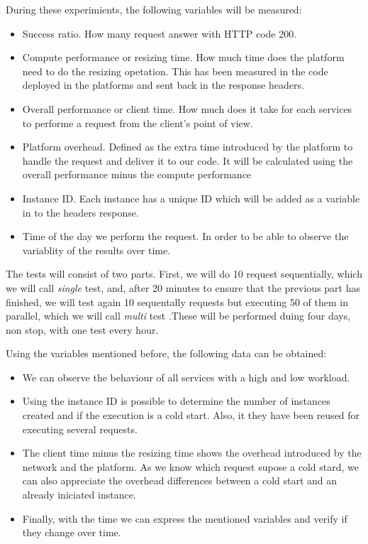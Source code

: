 \documentclass[11pt]{article}
\begin{document}
During these experimients, the following variables will be measured: 

\begin{itemize}
\item Success ratio. How many request answer with HTTP code 200.
\item Compute performance or resizing time. How much time does the platform need to do the resizing opetation. This has been measured in the code deployed in the platforms and sent back in the response headers. 
\item Overall performance or client time. How much does it take for each services to performe a request from the client's point of view. 
\item Platform overhead. Defined as the extra time introduced by the platform to handle the request and deliver it to our code. It will be calculated using the overall performance minus the compute performance
\item Instance ID. Each instance has a unique ID which will be added as a variable in to the headers response.
\item Time of the day we perform the request. In order to be able to observe the variablity of the results over time.
\end{itemize}


The tests will consist of two parts. First, we will do 10 request sequentially, which we will call \textit{single} test, and, after 20 minutes to ensure that the previous part has finished, we will test again 10 sequentally requests but executing 50 of them in parallel, which we will call \textit{multi} test .These will be performed duing four days, non stop, with one test every hour.


Using the variables mentioned before, the following data can be obtained:
\begin{itemize}
\item We can observe the behaviour of all services with a high and low workload.
\item Using the instance ID is possible to determine the number of instances created and if the execution is a cold start. Also, it they have been reused for executing several requests.
\item The client time minus the resizing time shows the overhead introduced by the network and the platform. As we know which request supose a cold stard, we can also appreciate the overhead differences between a cold start and an already iniciated instance.
\item Finally, with the time we can express the mentioned variables and verify if they change over time.
\end{itemize}
\end{document}
